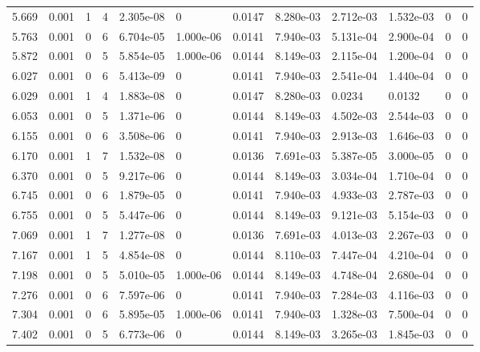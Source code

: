 \documentclass[preview]{standalone}
\begin{document}
{{{\begin{tabular}{L{1.2cm}C{1.2cm} C{0.3cm}C{0.5cm} C{1.4cm}C{1.4cm} C{1.4cm}C{1.4cm} C{1.6cm}C{1.6cm} C{1.6cm}C{1.6cm}}
  5.669  &  0.001  & 1     &  4 &  2.305e-08  & 0  &  0.0147&   8.280e-03& 2.712e-03 & 1.532e-03   &  0 & 0  \\ 
  5.763  &  0.001  & 0     &  6 &  6.704e-05  & 1.000e-06  &  0.0141&   7.940e-03& 5.131e-04 & 2.900e-04   &  0 & 0  \\ 
  5.872  &  0.001  & 0     &  5 &  5.854e-05  & 1.000e-06  &  0.0144&   8.149e-03& 2.115e-04 & 1.200e-04   &  0 & 0  \\ 
  6.027  &  0.001  & 0     &  6 &  5.413e-09  & 0  &  0.0141&   7.940e-03& 2.541e-04 & 1.440e-04   &  0 & 0  \\ 
  6.029  &  0.001  & 1     &  4 &  1.883e-08  & 0  &  0.0147&   8.280e-03& 0.0234 & 0.0132   &  0 & 0  \\ 
  6.053  &  0.001  & 0     &  5 &  1.371e-06  & 0  &  0.0144&   8.149e-03& 4.502e-03 & 2.544e-03   &  0 & 0  \\ 
  6.155  &  0.001  & 0     &  6 &  3.508e-06  & 0  &  0.0141&   7.940e-03& 2.913e-03 & 1.646e-03   &  0 & 0  \\ 
  6.170  &  0.001  & 1     &  7 &  1.532e-08  & 0  &  0.0136&   7.691e-03& 5.387e-05 & 3.000e-05   &  0 & 0  \\ 
  6.370  &  0.001  & 0     &  5 &  9.217e-06  & 0  &  0.0144&   8.149e-03& 3.034e-04 & 1.710e-04   &  0 & 0  \\ 
  6.745  &  0.001  & 0     &  6 &  1.879e-05  & 0  &  0.0141&   7.940e-03& 4.933e-03 & 2.787e-03   &  0 & 0  \\ 
  6.755  &  0.001  & 0     &  5 &  5.447e-06  & 0  &  0.0144&   8.149e-03& 9.121e-03 & 5.154e-03   &  0 & 0  \\ 
  7.069  &  0.001  & 1     &  7 &  1.277e-08  & 0  &  0.0136&   7.691e-03& 4.013e-03 & 2.267e-03   &  0 & 0  \\ 
  7.167  &  0.001  & 1     &  5 &  4.854e-08  & 0  &  0.0144&   8.110e-03& 7.447e-04 & 4.210e-04   &  0 & 0  \\ 
  7.198  &  0.001  & 0     &  5 &  5.010e-05  & 1.000e-06  &  0.0144&   8.149e-03& 4.748e-04 & 2.680e-04   &  0 & 0  \\ 
  7.276  &  0.001  & 0     &  6 &  7.597e-06  & 0  &  0.0141&   7.940e-03& 7.284e-03 & 4.116e-03   &  0 & 0  \\ 
  7.304  &  0.001  & 0     &  6 &  5.895e-05  & 1.000e-06  &  0.0141&   7.940e-03& 1.328e-03 & 7.500e-04   &  0 & 0  \\ 
  7.402  &  0.001  & 0     &  5 &  6.773e-06  & 0  &  0.0144&   8.149e-03& 3.265e-03 & 1.845e-03   &  0 & 0  \\ 

\end{tabular}}}}
\end{document}
